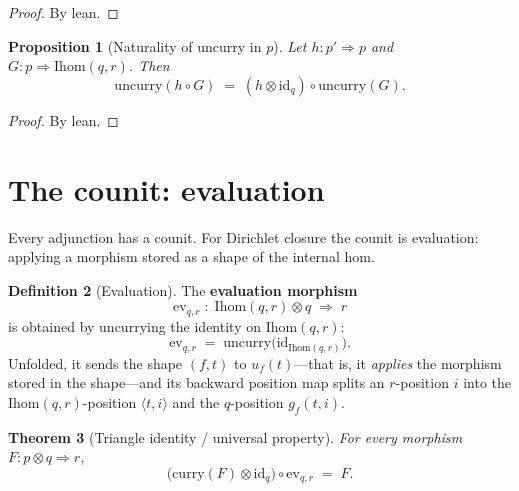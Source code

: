 \documentclass[11pt,a4paper]{article}
\theoremstyle{plain}
\newtheorem{theorem}{Theorem}[section]
\newtheorem{proposition}[theorem]{Proposition}
\theoremstyle{definition}
\newtheorem{definition}[theorem]{Definition}
\newcommand{\id}{\mathrm{id}}
\newcommand{\Ihom}{\mathrm{Ihom}}
\begin{document}
\begin{proof}
By lean.
\end{proof}

\begin{proposition}[Naturality of uncurry in $p$]\label{prop:uncurry-nat}
Let $h : p' \Rightarrow p$ and $G : p \Rightarrow \Ihom(q,r)$. Then
\begin{equation}
  \mathrm{uncurry}(h \circ G)
  \;=\;
  (h \otimes \id_q) \circ \mathrm{uncurry}(G).
\end{equation}
\end{proposition}

\begin{proof}
By lean.
\end{proof}

\section{The counit: evaluation}

Every adjunction has a counit. For Dirichlet closure the counit is
evaluation: applying a morphism stored as a shape of the internal hom.

\begin{definition}[Evaluation]\label{def:eval}
The \textbf{evaluation morphism}
\begin{equation}
  \mathrm{ev}_{q,r}
  \;:\;
  \Ihom(q,r) \otimes q \;\Rightarrow\; r
\end{equation}
is obtained by uncurrying the identity on $\Ihom(q,r)$:
\begin{equation}
  \mathrm{ev}_{q,r}
  \;=\;
  \mathrm{uncurry}\bigl(\id_{\Ihom(q,r)}\bigr).
\end{equation}
Unfolded, it sends the shape $(f,t)$ to $u_f(t)$---that is, it
\emph{applies} the morphism stored in the shape---and its backward position
map splits an $r$-position $i$ into the $\Ihom(q,r)$-position
$\langle t, i \rangle$ and the $q$-position $g_f(t,i)$.
\end{definition}

\begin{theorem}[Triangle identity / universal property]\label{thm:triangle}
For every morphism $F : p \otimes q \Rightarrow r$,
\begin{equation}
  \bigl(\mathrm{curry}(F) \otimes \id_q\bigr) \circ \mathrm{ev}_{q,r}
  \;=\;
  F.
\end{equation}
\end{theorem}
\end{document}
